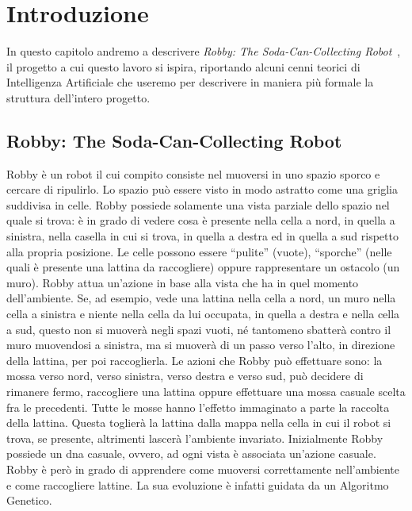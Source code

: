 \chapter{Introduzione}
In questo capitolo andremo a descrivere \textit{Robby: The Soda-Can-Collecting
Robot}~\cite{biblio:robby}, il progetto a cui questo lavoro si ispira,
riportando alcuni cenni teorici di Intelligenza Artificiale che useremo per
descrivere in maniera più formale la struttura dell'intero progetto.



\section{Robby: The Soda-Can-Collecting Robot}
Robby è un robot il cui compito consiste nel muoversi in uno spazio sporco e
cercare di ripulirlo. Lo spazio può essere visto in modo astratto come una
griglia suddivisa in celle. Robby possiede solamente una vista parziale dello
spazio nel quale si trova: è in grado di vedere cosa è presente nella cella a
nord, in quella a sinistra, nella casella in cui si trova, in quella a destra ed
in quella a sud rispetto alla propria posizione. Le celle possono essere
``pulite'' (vuote), ``sporche'' (nelle quali è presente una lattina da
raccogliere) oppure rappresentare un ostacolo (un muro).\newline
Robby attua un'azione in base alla vista che ha in quel momento dell'ambiente.
Se, ad esempio, vede una lattina nella cella a nord, un muro nella cella a
sinistra e niente nella cella da lui occupata, in quella a destra e nella cella
a sud, questo non si muoverà negli spazi vuoti, né tantomeno sbatterà contro il
muro muovendosi a sinistra, ma si muoverà di un passo verso l'alto, in direzione
della lattina, per poi raccoglierla. Le azioni che Robby può effettuare sono: la
mossa verso nord, verso sinistra, verso destra e verso sud, può decidere di
rimanere fermo, raccogliere una lattina oppure effettuare una mossa casuale
scelta fra le precedenti. Tutte le mosse hanno l'effetto immaginato a parte la
raccolta della lattina. Questa toglierà la lattina dalla mappa nella cella in
cui il robot si trova, se presente, altrimenti lascerà l'ambiente
invariato.\newline
Inizialmente Robby possiede un dna casuale, ovvero, ad ogni vista è associata
un'azione casuale. Robby è però in grado di apprendere come muoversi
correttamente nell'ambiente e come raccogliere lattine. La sua evoluzione è
infatti guidata da un Algoritmo Genetico.



